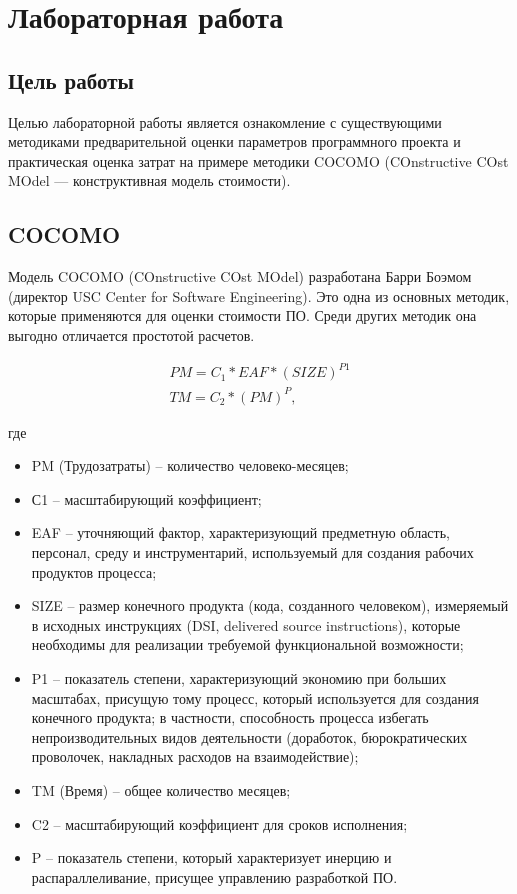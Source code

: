 \chapter{Лабораторная работа}

\section*{Цель работы}

Целью лабораторной работы является ознакомление с существующими методиками предварительной оценки параметров программного проекта и практическая оценка затрат на примере методики COCOMO (COnstructive COst MOdel — конструктивная модель стоимости).

\section*{COCOMO}

Модель COCOMO (COnstructive COst MOdel) разработана Барри Боэмом (директор USC Center for Software Engineering). Это одна из основных методик, которые применяются для оценки стоимости ПО. Среди других методик она выгодно отличается простотой расчетов.

\begin{equation}
	\begin{split}
		PM=C_1*EAF*(SIZE)^{P1} \\
		TM=C_2*(PM)^P,
	\end{split}
\end{equation}

где 
\begin{itemize}
	\item PM (Трудозатраты) -- количество человеко-месяцев;
	\item С1 -- масштабирующий коэффициент;
	\item EAF -- уточняющий фактор, характеризующий предметную область, персонал, среду и инструментарий, используемый для создания рабочих продуктов процесса;
	\item SIZE -- размер конечного продукта (кода, созданного человеком), измеряемый в исходных инструкциях (DSI, delivered source instructions), которые необходимы для реализации требуемой функциональной возможности; 
	\item P1 -- показатель степени, характеризующий экономию при больших масштабах, присущую тому процесс, который используется для создания конечного продукта; в частности, способность процесса избегать непроизводительных видов деятельности (доработок, бюрократических проволочек, накладных расходов на взаимодействие);
	\item TM (Время) -- общее количество месяцев; 
	\item C2 -- масштабирующий коэффициент для сроков исполнения; 
	\item P -- показатель степени, который характеризует инерцию и распараллеливание, присущее управлению разработкой ПО.
\end{itemize}
    
